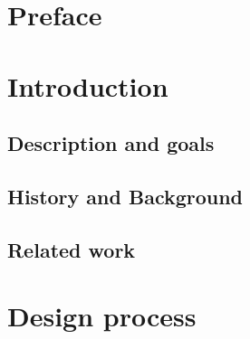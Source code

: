 \documentclass[BSP,english,oneside]{classes/gucthesis}
\begin{document}


\makefrontpages



\clearpage
\setcounter{page}{1}



\chapter*{Preface}
	\label{chap:preface}
	


\tableofcontents
\listoffigures


\newpage
\setcounter{page}{1}
\chapter{Introduction}
	
		\setcounter{page}{2}	%
		\label{sec:introduction}
		

	\section{Description and goals}
		\label{sec:description_goals}
		

	\section{History and Background}
		\label{sec:history_and_background}
		

	\section{Related work}
		\label{sec:related_work}
		


\chapter{Design process}
	\label{chap:design_process}
\end{document}
